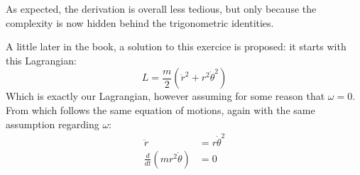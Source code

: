 \documentclass[solutions.tex]{subfiles}
\begin{document}
\begin{remark} As expected, the derivation is overall less tedious,
but only because the complexity is now hidden behind the
trigonometric identities.
\end{remark}
\begin{remark} A little later in the book, a solution to this
exercice is proposed: it starts with this Lagrangian:
\[
	L = \frac{m}{2}\left(\dot{r}^2+r^2\dot\theta^2\right)
\]
Which is exactly our Lagrangian, however assuming for some
reason that $\omega = 0$. From which follows the same equation
of motions, again with the same assumption regarding $\omega$:
\begin{align*}
	\ddot{r} &= r\dot\theta^2 \\
	\frac{d}{dt}\left(mr^2\dot\theta\right) &= 0
\end{align*}
\end{remark}
\end{document}
